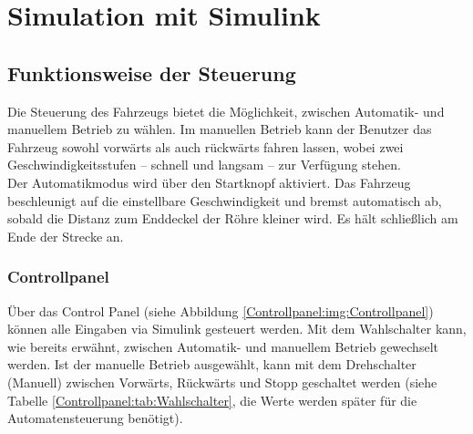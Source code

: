 
\newpage
\section{Simulation mit Simulink}
\label{section:Simulation}



\subsection{Funktionsweise der Steuerung}
\label{Steuerung}


Die Steuerung des Fahrzeugs bietet die Möglichkeit, zwischen Automatik- und manuellem Betrieb zu wählen. Im manuellen Betrieb kann der Benutzer das Fahrzeug sowohl vorwärts als auch rückwärts fahren lassen, wobei zwei Geschwindigkeitsstufen – schnell und langsam – zur Verfügung stehen.\\
Der Automatikmodus wird über den Startknopf aktiviert. Das Fahrzeug beschleunigt auf die einstellbare Geschwindigkeit und bremst automatisch ab, sobald die Distanz zum Enddeckel der Röhre kleiner wird. Es hält schließlich am Ende der Strecke an.\\

\subsubsection{Controllpanel}
\label{Steuerung:Controllpanel}
Über das Control Panel (siehe Abbildung \ref{Controllpanel:img:Controllpanel}) können alle Eingaben via Simulink gesteuert werden. Mit dem Wahlschalter kann, wie bereits erwähnt, zwischen Automatik- und manuellem Betrieb gewechselt werden. Ist der manuelle Betrieb ausgewählt, kann mit dem Drehschalter (Manuell) zwischen Vorwärts, Rückwärts und Stopp geschaltet werden (siehe Tabelle \ref{Controllpanel:tab:Wahlschalter}, die Werte werden später für die Automatensteuerung benötigt).\\


